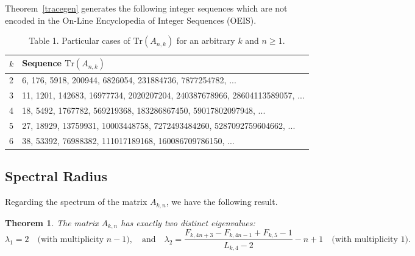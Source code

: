 \documentclass[11pt]{birkjour}
\newtheorem{thm}{Theorem}[section]
\theoremstyle{definition}
\theoremstyle{remark}
\numberwithin{equation}{section}
\begin{document}
\noindent Theorem~\ref{tracegen} generates the following integer sequences which are not encoded in the On-Line Encyclopedia of Integer Sequences (OEIS).



\begin{table}[h!]
\begin{tabular}{|l|l|}
\hline $k$ & Sequence $\mathrm{Tr}(A_{n, k})$ \\
\hline 2 &  6, 176, 5918, 200944, 6826054, 231884736, 7877254782, ...   \\
\hline 3 & 11, 1201, 142683, 16977734, 2020207204, 240387678966, 28604113589057, ... \\
\hline 4 & 18, 5492, 1767782, 569219368, 183286867450, 59017802097948, ...    \\
\hline 5 & 27, 18929, 13759931, 10003448758, 7272493484260, 5287092759604662, ...  \\

\hline 6 & 38, 53392, 76988382, 111017189168, 160086709786150, ...  \\
\hline
\end{tabular}
\captionsetup{labelformat=empty}
\caption{Table 1. Particular cases of $\mathrm{Tr}(A_{n, k})$ for an arbitrary $k$ and $n\geq 1$.}
\end{table}






\subsection{Spectral Radius}
Regarding the spectrum of the matrix $A_{k,n}$, we have the following result.

\begin{thm}\label{eigegen}
The matrix $A_{k,n}$ has exactly two distinct eigenvalues:
\[
\lambda_{1}=2 
\quad \text{(with multiplicity } n - 1\text{)}, 
\quad \text{and} \quad 
\lambda_{2}=\frac{F_{k,4n + 3} - F_{k,4n - 1} + F_{k,5}-1}{L_{k,4}-2}-n+1
\quad \text{(with multiplicity 1)}.
\]
\end{thm}
\end{document}
